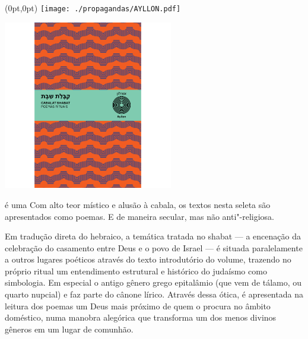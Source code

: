 \pagestyle{ayllon}
\label{ayllon}


\begin{textblock*}{5.625in}(0pt,0pt)%
\vspace*{-3.49cm}
\hspace*{-2.76cm}\texttt{[image: ./propagandas/AYLLON.pdf]}
\end{textblock*}

\pagebreak %

\begin{center}
\hspace*{.5cm}\includegraphics[width=74mm]{./grid/cabalat.png}
\end{center}

\hspace*{-7cm}\hrulefill\hspace*{-7cm}

\medskip

 é uma  Com alto teor místico e alusão à cabala, os textos nesta seleta são apresentados como poemas. E de maneira secular, mas não anti"-religiosa.

Em tradução direta do hebraico, a temática tratada no shabat --- a encenação da celebração do casamento entre Deus e o povo de Israel --- é situada paralelamente a outros lugares poéticos através do texto introdutório do volume, trazendo no próprio ritual um entendimento estrutural e histórico do judaísmo como simbologia. Em especial o antigo gênero grego epitalâmio (que vem de tálamo, ou quarto nupcial) e faz parte do cânone lírico. Através dessa ótica, é apresentada na leitura dos poemas um Deus mais próximo de quem o procura no âmbito doméstico, numa manobra alegórica que transforma um dos menos divinos gêneros em um lugar de comunhão.


